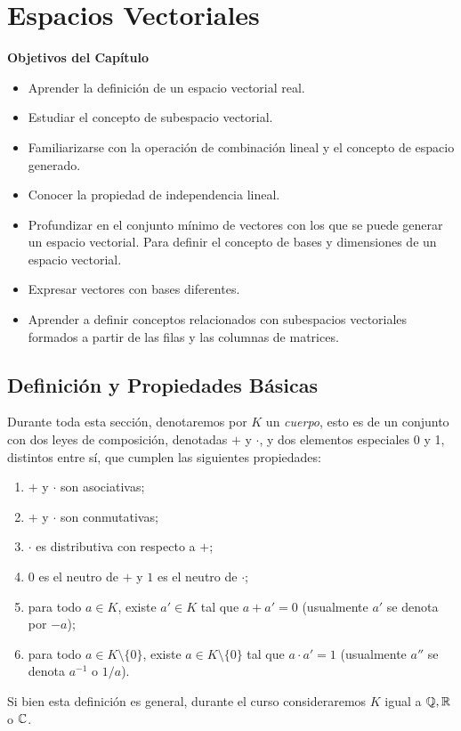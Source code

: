 \section{Espacios Vectoriales}

\textbf{Objetivos del Capítulo}

\begin{itemize}
\item
Aprender la definici\'on de un espacio vectorial real.

\item
Estudiar el concepto de subespacio vectorial.

\item
Familiarizarse con la operación de combinación lineal y el concepto de espacio generado.

\item
Conocer la propiedad de independencia lineal.

\item
Profundizar en el conjunto mínimo de vectores con los que se puede generar un espacio vectorial. Para definir el concepto de bases y dimensiones de un espacio vectorial.

\item
Expresar vectores con bases diferentes.

\item
Aprender a definir conceptos relacionados con subespacios vectoriales formados a partir de las filas y las columnas de matrices.

\end{itemize}



\subsection{Definición y Propiedades Básicas}

Durante toda esta secci\'on, denotaremos por $K$ un \emph{cuerpo}, esto es de un conjunto con dos leyes de composici\'on, denotadas $+$ y $\cdot$, y dos elementos especiales 0 y 1, distintos entre s\'i, que cumplen las siguientes
propiedades:

\begin{enumerate}
    \item $+$ y $\cdot$ son asociativas;
    \item $+$ y $\cdot$ son conmutativas;
    \item $\cdot$ es distributiva con respecto a $+$;
    \item $0$ es el neutro de $+$ y $1$ es el neutro de $\cdot$;
    \item para todo $a \in K$, existe $a'\in  K$ tal que $a + a'=0$ (usualmente $a'$ se denota por $-a$);
    \item para todo $a \in K\setminus \{0\}$, existe $a \in K \setminus \{0\}$ tal que $a \cdot a' = 1$ (usualmente $a''$ se denota $a^{-1}$ o $1/a$).
\end{enumerate}
Si bien esta definici\'on es general, durante el curso consideraremos $K$ igual a $\mathbb{Q}, \mathbb{R}$ o $\mathbb{C}$.

